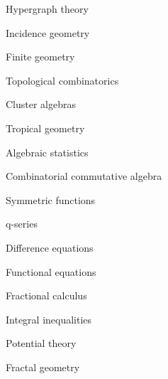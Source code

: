 \item Hypergraph theory
\item Incidence geometry
\item Finite geometry
\item Topological combinatorics
\item Cluster algebras
\item Tropical geometry
\item Algebraic statistics
\item Combinatorial commutative algebra
\item Symmetric functions
\item q-series
\item Difference equations
\item Functional equations
\item Fractional calculus
\item Integral inequalities
\item Potential theory
\item Fractal geometry
